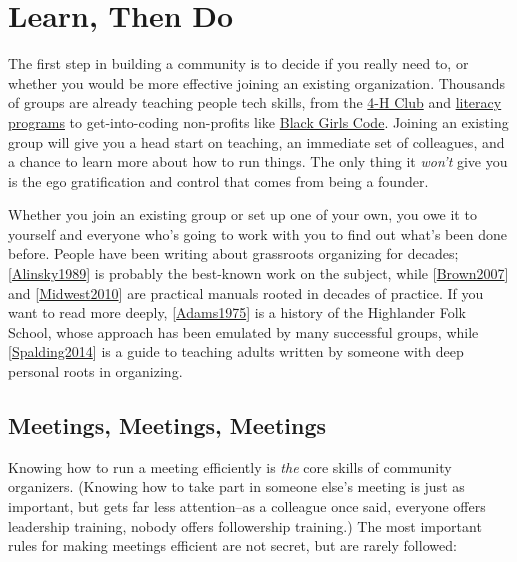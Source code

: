 \documentclass[10pt,statementpaper]{memoir}
\begin{document}
\section{Learn, Then Do}\label{learn-then-do}

The first step in building a community is to decide if you really need
to, or whether you would be more effective joining an existing
organization. Thousands of groups are already teaching people tech
skills, from the \href{http://www.4-h-canada.ca/}{4-H Club} and
\href{https://www.frontiercollege.ca/}{literacy programs} to
get-into-coding non-profits like
\href{http://www.blackgirlscode.com/}{Black Girls Code}. Joining an
existing group will give you a head start on teaching, an immediate set
of colleagues, and a chance to learn more about how to run things. The
only thing it \emph{won't} give you is the ego gratification and control
that comes from being a founder.

Whether you join an existing group or set up one of your own, you owe it
to yourself and everyone who's going to work with you to find out what's
been done before. People have been writing about grassroots organizing
for decades; {[}\href{biblio.html\#alinsky-rules}{Alinsky1989}{]} is
probably the best-known work on the subject, while
{[}\href{biblio.html\#brown-bpco}{Brown2007}{]} and
{[}\href{biblio.html\#midwest-organizing}{Midwest2010}{]} are practical
manuals rooted in decades of practice. If you want to read more deeply,
{[}\href{biblio.html\#adams-seeds}{Adams1975}{]} is a history of the
Highlander Folk School, whose approach has been emulated by many
successful groups, while
{[}\href{biblio.html\#spalding-adults}{Spalding2014}{]} is a guide to
teaching adults written by someone with deep personal roots in
organizing.

\subsection{Meetings, Meetings,
Meetings}\label{meetings-meetings-meetings}

Knowing how to run a meeting efficiently is \emph{the} core skills of
community organizers. (Knowing how to take part in someone else's
meeting is just as important, but gets far less attention--as a
colleague once said, everyone offers leadership training, nobody offers
followership training.) The most important rules for making meetings
efficient are not secret, but are rarely followed:
\end{document}

